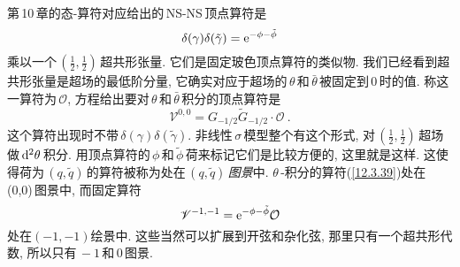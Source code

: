 第\,10\,章的态-算符对应给出的\,NS-NS\,顶点算符是
\begin{equation}
    \delta(\gamma)\delta(\tilde{\gamma}) = \mathrm{e}^{-\phi-\tilde{\phi}} \label{12.3.38}
\end{equation}
乘以一个$\,(\tfrac{1}{2},\tfrac{1}{2})\,$超共形张量.  它们是固定玻色顶点算符的类似物. 我们已经看到超共形张量是超场的最低阶分量, 它确实对应于超场的$\,\theta\,$和$\,\bar{\theta}\,$被固定到$\,0\,$时的值. 称这一算符为$\,\mathcal{O}$, 方程给出要对$\,\theta\,$和$\,\bar{\theta}\,$积分的顶点算符是
\begin{equation}
    \mathscr{V}^{0,0}= G_{-1/2}\tilde{G}_{-1/2} \cdot\mathcal{O} \:. \label{12.3.39}
\end{equation}
这个算符出现时不带$\,\delta(\gamma)\delta(\tilde{\gamma})$. 非线性\,$\sigma$\,模型整个有这个形式, 对$\,(\tfrac{1}{2},\tfrac{1}{2})\,$超场做$\,\mathrm{d}^{2}\theta\,$积分. 用顶点算符的$\,\phi\,$和$\,\tilde{\phi}\,$荷来标记它们是比较方便的, 这里就是这样. 这使得荷为$\,(q,\tilde{q})\,$的算符被称为处在$\,(q,\tilde{q})\,${\emph{图景}}中. $\theta\,$-积分的算符(\ref{12.3.39})处在\,(0,0)\,图景中, 而固定算符
\begin{equation}
    \mathscr{V}^{-1,-1} = \mathrm{e}^{-\phi-\tilde{\phi}}\mathcal{O} \label{12.3.40}
\end{equation}
处在$(-1,-1)$绘景中. 这些当然可以扩展到开弦和杂化弦, 那里只有一个超共形代数, 所以只有$\,-1\,$和$\,0\,$图景.

